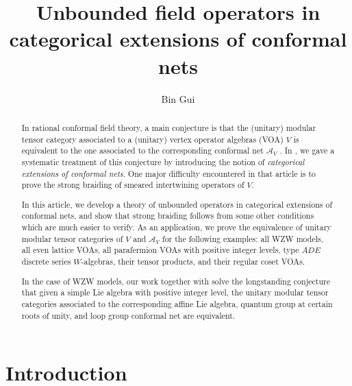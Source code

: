 \documentclass[11pt,b5paper,notitlepage]{article}
\title{Unbounded field operators in categorical extensions  of conformal nets}
\author{{\sc Bin Gui}%
}
\date{}
\theoremstyle{definition}
\theoremstyle{plain}
\newcommand{\mc}{\mathcal}
\numberwithin{equation}{subsection}
\begin{document}
\sloppy %
	\setcounter{section}{-1}
	
	\maketitle


	


	
	
	
	
	
	
\tableofcontents
	
\newpage


\begin{abstract}	
	
	
In  rational conformal field theory, a main conjecture is that the (unitary) modular tensor category associated to a (unitary) vertex operator algebras (VOA) $V$ is equivalent to the one associated to the corresponding  conformal net $\mc A_V$ \cite{Kaw15,Kaw18}. In \cite{Gui21a}, we gave a systematic treatment of this conjecture by introducing the notion of \emph{categorical extensions of conformal nets}. One major difficulty encountered in that article is to prove the strong braiding of smeared intertwining operators of $V$. 

In this article, we develop a theory of unbounded operators in categorical extensions of conformal nets, and show that strong braiding follows from some other conditions which are much easier to verify. As an application, we prove the equivalence of unitary modular tensor categories of $V$ and $\mc A_V$ for the following examples: all WZW models, all even lattice VOAs, all parafermion VOAs with positive integer levels,  type $ADE$ discrete series $W$-algebras,  their tensor products, and their regular coset VOAs.  

In the case of WZW models, our work together with \cite{Fin96} solve the longstanding conjecture that given a simple Lie algebra with positive integer level, the unitary modular tensor categories associated to the corresponding affine Lie algebra, quantum group at certain roots of unity, and loop group conformal net are equivalent.
\end{abstract}

\section{Introduction}
\end{document}
